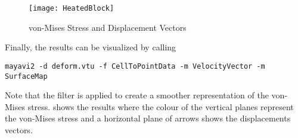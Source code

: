 \begin{figure}
\centerline{\texttt{[image: HeatedBlock]}}
\caption{von-Mises Stress and Displacement Vectors}
\label{HEATEDBLOCK FIG 2}
\end{figure}

Finally, the results can be visualized by calling
\begin{verbatim}
mayavi2 -d deform.vtu -f CellToPointData -m VelocityVector -m SurfaceMap
\end{verbatim}
Note that the filter  is applied to create a smoother
representation of the von-Mises stress.
 shows the results where the colour of the vertical
planes represent the von-Mises stress and a horizontal plane of arrows shows
the displacements vectors.


